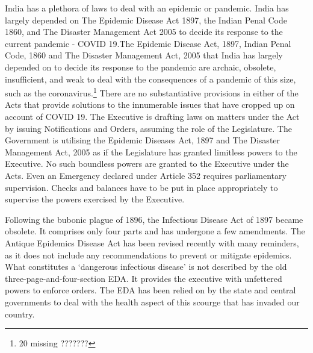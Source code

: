 \begin{multicols}{2}

\noi
India has a plethora of laws to deal with an epidemic or pandemic. India has largely depended
on The Epidemic Disease Act 1897, the Indian Penal Code 1860, and The Disaster
Management Act 2005 to decide its response to the current pandemic - COVID 19.The
Epidemic Disease Act, 1897, Indian Penal Code, 1860 and The Disaster Management Act,
2005 that India has largely depended on to decide its response to the pandemic are archaic,
obsolete, insufficient, and weak to deal with the consequences of a pandemic of this size, 
such as the coronavirus.\footnote{20 missing ???????} There are no substantiative provisions in either of the Acts that
provide solutions to the innumerable issues that have cropped up on account of COVID 19.
The Executive is drafting laws on matters under the Act by issuing Notifications and Orders,
assuming the role of the Legislature. The Government is utilising the Epidemic Diseases Act,
1897 and The Disaster Management Act, 2005 as if the Legislature has granted limitless
powers to the Executive. No such boundless powers are granted to the Executive under the
Acts. Even an Emergency declared under Article 352 requires parliamentary supervision.
Checks and balances have to be put in place appropriately to supervise the powers exercised
by the Executive.


\noi
Following the bubonic plague of 1896, the Infectious Disease Act of 1897 became obsolete.
It comprises only four parts and has undergone a few amendments. The Antique Epidemics
Disease Act has been revised recently with many reminders, as it does not include any
recommendations to prevent or mitigate epidemics. What constitutes a ‘dangerous infectious
disease' is not described by the old three-page-and-four-section EDA. It provides the
executive with unfettered powers to enforce orders. The EDA has been relied on by the state
and central governments to deal with the health aspect of this scourge that has invaded our
country.


\end{multicols}
